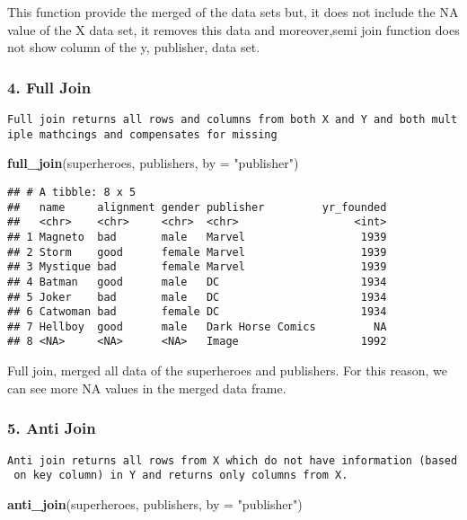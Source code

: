 \documentclass[
]{article}
\newenvironment{Shaded}{\begin{snugshade}}{\end{snugshade}}
\newcommand{\DataTypeTok}[1]{\textcolor[rgb]{0.13,0.29,0.53}{#1}}
\newcommand{\KeywordTok}[1]{\textcolor[rgb]{0.13,0.29,0.53}{\textbf{#1}}}
\newcommand{\NormalTok}[1]{#1}
\newcommand{\StringTok}[1]{\textcolor[rgb]{0.31,0.60,0.02}{#1}}
\begin{document}
This function provide the merged of the data sets but, it does not
include the NA value of the X data set, it removes this data and
moreover,semi join function does not show column of the y, publisher,
data set.

\hypertarget{full-join}{%
\subsubsection{4. Full Join}\label{full-join}}

\texttt{Full\ join\ returns\ all\ rows\ and\ columns\ from\ both\ X\ and\ Y\ and\ both\ multiple\ mathcings\ and\ compensates\ for\ missing}

\begin{Shaded}
\begin{Highlighting}[]
\KeywordTok{full\_join}\NormalTok{(superheroes, publishers, }\DataTypeTok{by =} \StringTok{"publisher"}\NormalTok{)}
\end{Highlighting}
\end{Shaded}

\begin{verbatim}
## # A tibble: 8 x 5
##   name     alignment gender publisher         yr_founded
##   <chr>    <chr>     <chr>  <chr>                  <int>
## 1 Magneto  bad       male   Marvel                  1939
## 2 Storm    good      female Marvel                  1939
## 3 Mystique bad       female Marvel                  1939
## 4 Batman   good      male   DC                      1934
## 5 Joker    bad       male   DC                      1934
## 6 Catwoman bad       female DC                      1934
## 7 Hellboy  good      male   Dark Horse Comics         NA
## 8 <NA>     <NA>      <NA>   Image                   1992
\end{verbatim}

Full join, merged all data of the superheroes and publishers. For this
reason, we can see more NA values in the merged data frame.

\hypertarget{anti-join}{%
\subsubsection{5. Anti Join}\label{anti-join}}

\texttt{Anti\ join\ returns\ all\ rows\ from\ X\ which\ do\ not\ have\ information\ (based\ on\ key\ column)\ in\ Y\ and\ returns\ only\ columns\ from\ X.}

\begin{Shaded}
\begin{Highlighting}[]
\KeywordTok{anti\_join}\NormalTok{(superheroes, publishers, }\DataTypeTok{by =} \StringTok{"publisher"}\NormalTok{)}
\end{Highlighting}
\end{Shaded}
\end{document}
